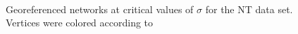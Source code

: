 \documentclass[12pt]{article}
\begin{document}
\begin{figure}[!ht]
\\
\caption{\footnotesize Georeferenced networks at critical values of $\sigma$ for the NT data set.
Vertices were colored according to}
\label{fig:netsNT}
\end{figure}
\end{document}
